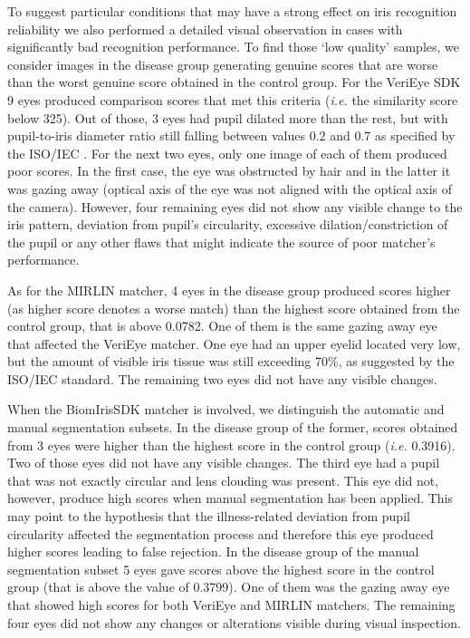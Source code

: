 \documentclass[a4paper]{spie}
\begin{document}
To suggest particular conditions that may have a strong effect on iris recognition reliability we also performed a detailed visual observation in cases with significantly bad recognition performance. To find those `low quality' samples, we consider images in the disease group generating genuine scores that are worse than the worst genuine score obtained in the control group. For the VeriEye SDK 9 eyes produced comparison scores that met this criteria (\emph{i.e.} the similarity score below 325). Out of those, 3 eyes had pupil dilated more than the rest, but with pupil-to-iris diameter ratio still falling between values 0.2 and 0.7 as specified by the ISO/IEC \cite{ISO2}. For the next two eyes, only one image of each of them produced poor scores. In the first case, the eye was obstructed by hair and in the latter it was gazing away (optical axis of the eye was not aligned with the optical axis of the camera). However, four remaining eyes did not show any visible change to the iris pattern, deviation from pupil's circularity, excessive dilation/constriction of the pupil or any other flaws that might indicate the source of poor matcher's performance.

As for the MIRLIN matcher, 4 eyes in the disease group produced scores higher (as higher score denotes a worse match) than the highest score obtained from the control group, that is above 0.0782. One of them is the same gazing away eye that affected the VeriEye matcher. One eye had an upper eyelid located very low, but the amount of visible iris tissue was still exceeding 70\%, as suggested by the ISO/IEC standard. The remaining two eyes did not have any visible changes.

When the BiomIrisSDK matcher is involved, we distinguish the automatic and manual segmentation subsets. In the disease group of the former, scores obtained from 3 eyes were higher than the highest score in the control group (\emph{i.e.} 0.3916). Two of those eyes did not have any visible changes. The third eye had a pupil that was not exactly circular and lens clouding was present. This eye did not, however, produce high scores when manual segmentation has been applied. This may point to the hypothesis that the illness-related deviation from pupil circularity affected the segmentation process and therefore this eye produced higher scores leading to false rejection. In the disease group of the manual segmentation subset 5 eyes gave scores above the highest score in the control group (that is above the value of 0.3799). One of them was the gazing away eye that showed high scores for both VeriEye and MIRLIN matchers. The remaining four eyes did not show any changes or alterations visible during visual inspection.
\end{document}
